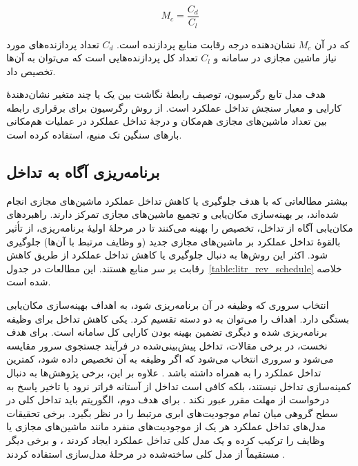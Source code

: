 \begin{equation} \label{eq:rel_res_contention}
    M_c = \frac{C_d}{C_l}
\end{equation}

که در آن $M_c$ نشان‌دهنده درجه رقابت منابع پردازنده است. $C_d$ تعداد پردازنده‌های مورد نیاز ماشین مجازی در سامانه و $C_l$ تعداد کل پردازنده‌هایی است که می‌توان به آن‌ها تخصیص داد.

هدف مدل تابع رگرسیون، توصیف رابطهٔ نگاشت بین یک یا چند متغیر نشان‌دهندهٔ کارایی و معیار سنجش تداخل عملکرد است. \cite{jersak2016performance} از روش رگرسیون برای برقراری رابطه بین تعداد ماشین‌های مجازی هم‌مکان و درجهٔ تداخل عملکرد در عملیات هم‌مکانی بارهای سنگین تک منبع، استفاده کرده است.

\subsection{برنامه‌ریزی آگاه به تداخل}

بیشتر مطالعاتی که با هدف جلوگیری یا کاهش تداخل عملکرد ماشین‌های مجازی انجام شده‌اند، بر بهینه‌سازی مکان‌یابی و تجمیع ماشین‌های مجازی تمرکز دارند. راهبردهای مکان‌یابی آگاه از تداخل، تخصیص را بهینه می‌کنند تا در مرحلهٔ اولیهٔ برنامه‌ریزی، از تأثیر بالقوهٔ تداخل عملکرد بر ماشین‌های مجازی جدید (و وظایف مرتبط با آن‌ها) جلوگیری شود. اکثر این روش‌ها به دنبال جلوگیری یا کاهش تداخل عملکرد از طریق کاهش رقابت بر سر منابع هستند. این مطالعات در جدول~\ref{table:litr_rev_schedule} خلاصه شده‌ است.

انتخاب سروری که وظیفه در آن برنامه‌ریزی شود، به اهداف بهینه‌سازی مکان‌یابی بستگی دارد. اهداف را می‌توان به دو دسته تقسیم کرد. یکی کاهش تداخل برای وظیفه برنامه‌ریزی شده و دیگری تضمین بهینه بودن کارایی کل سامانه است. برای هدف نخست، در برخی مقالات، تداخل پیش‌بینی‌شده در فرآیند جستجوی سرور مقایسه می‌شود و سروری انتخاب می‌شود که اگر وظیفه به آن تخصیص داده شود، کمترین تداخل عملکرد را به همراه داشته باشد \cite{zhang2015minimizing,romero2018mage}. علاوه بر این، برخی پژوهش‌ها به دنبال کمینه‌سازی تداخل نیستند، بلکه کافی است تداخل از آستانه فراتر نرود \cite{Bu2013ILA, jersak2016performance, angelou2016improving} یا تاخیر پاسخ به درخواست از مهلت مقرر عبور نکند \cite{Chen2017Prophet}. برای هدف دوم، الگوریتم باید تداخل کلی در سطح گروهی میان تمام موجودیت‌های ابری مرتبط را در نظر بگیرد. برخی تحقیقات مدل‌های تداخل عملکرد هر یک از موجودیت‌های منفرد مانند ماشین‌های مجازی یا وظایف را ترکیب کرده و یک مدل کلی تداخل عملکرد ایجاد کردند \cite{meloalves2018interference, hamdi2019managing, lin2012interference}، و برخی دیگر مستقیماً از مدل کلی ساخته‌شده در مرحلهٔ مدل‌سازی استفاده کردند \cite{Shaw2019Energy}.

